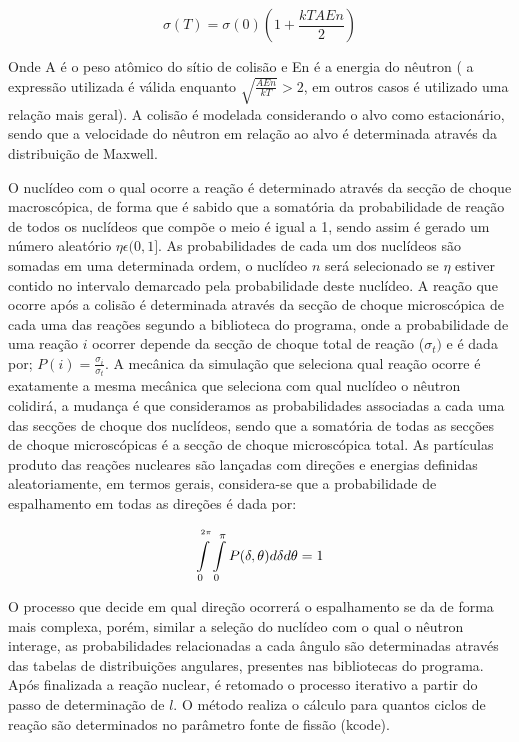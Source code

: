 \documentclass[
	12pt,				%
	openany,			%
	twoside,			%
	a4paper,			%
	english,			%
	french,				%
	spanish,			%
	brazil				%
	]{abntex2}
\begin{document}
\begin{equation}
\sigma(T)=\sigma(0)(1+\frac{kTAEn}{2})
\end{equation}

Onde A é o peso atômico do sítio de colisão e En é a energia do nêutron ( a expressão utilizada é válida enquanto $\sqrt{\frac{AEn}{kT}}>2$, em outros casos é utilizado uma relação mais geral). A colisão é modelada considerando o alvo como estacionário, sendo que a velocidade do nêutron em relação ao alvo é determinada através da distribuição de Maxwell.

O nuclídeo com o qual ocorre a reação é determinado através da secção de choque macroscópica, de forma que é sabido que a somatória da probabilidade de reação de todos os nuclídeos que compõe o meio é igual a 1, sendo assim é gerado um número aleatório $\eta\epsilon(0,1]$. As probabilidades de cada um dos nuclídeos são somadas em uma determinada ordem, o nuclídeo
$n$ será selecionado se $\eta$ estiver contido no intervalo demarcado pela probabilidade deste nuclídeo. A reação que ocorre após a colisão é determinada através da secção de choque microscópica de cada uma das reações segundo a biblioteca do programa, onde a probabilidade de uma reação $i$ ocorrer depende da secção de choque total de reação ($\sigma_{t})$ e é dada por; $P(i)=\frac{\sigma_{i}}{\sigma_{t}}$. A mecânica da simulação que seleciona qual reação ocorre é exatamente a mesma mecânica que seleciona com qual nuclídeo o nêutron colidirá, a mudança é que consideramos as probabilidades associadas a cada uma das secções de choque dos nuclídeos, sendo que a somatória de todas as secções de choque microscópicas é a secção de choque microscópica
total.
As partículas produto das reações nucleares são lançadas com direções e energias definidas aleatoriamente, em termos gerais, considera-se que a probabilidade de espalhamento em todas as direções é dada por:

\begin{equation}
\intop_{0}^{^{2\pi}}\intop_{0}^{\pi}P(\delta,\theta)d\delta d\theta=1
\end{equation}

O processo que decide em qual direção ocorrerá o espalhamento se da de forma mais complexa, porém, similar a seleção do nuclídeo com o qual o nêutron interage, as probabilidades relacionadas a cada ângulo são determinadas através das tabelas de distribuições angulares, presentes nas bibliotecas do programa. Após finalizada a reação nuclear, é retomado o processo iterativo a partir do passo de determinação de $l$. O método realiza o cálculo para quantos ciclos de reação são determinados no parâmetro fonte de fissão (kcode). 
\end{document}
